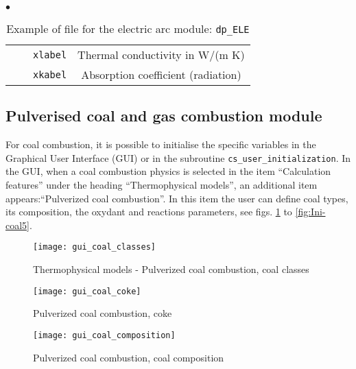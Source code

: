 {{\begin{list}{$\bullet$}{}
\begin{table}[htbp]
\begin{center}
{\begin{tabular}{|c|l|c|c|}
        &                    &    \texttt{xlabel}               & Thermal conductivity in W/(m K)                    \\
        &                    &    \texttt{xkabel\index{xkabel}} & Absorption coefficient (radiation)                 \\   \hline
\end{tabular}
}
\caption{Example of file for the electric arc module:
 \texttt{dp\_ELE}}\label{tab_dpELE}
\end{center}
\end{table}

\end{list}

\clearpage


\subsection{Pulverised
  coal and gas combustion module}
\label{sec:Ini-coal}
For coal combustion, it is possible to initialise the specific variables in the Graphical User Interface (GUI) or in the subroutine \texttt{cs\_user\_initialization}. In the GUI, when a coal combustion physics is selected in the item ``Calculation features'' under the heading ``Thermophysical models'', an additional item appears:``Pulverized coal combustion''. In this item the user can define coal types, its composition, the oxydant and reactions parameters, see figs. \ref{fig:Ini-coal1} to \ref{fig:Ini-coal5}.

\begin{figure}[!ht]
\begin{center}
\texttt{[image: gui\_coal\_classes]}
\caption{Thermophysical models - Pulverized coal combustion, coal classes}
\label{fig:Ini-coal1}
\end{center}
\end{figure}

\begin{figure}[!ht]
\begin{center}
\texttt{[image: gui\_coal\_coke]}
\caption{Pulverized coal combustion, coke}
\label{fig:Ini-coal2}
\end{center}
\end{figure}

\begin{figure}[!ht]
\begin{center}
\texttt{[image: gui\_coal\_composition]}
\caption{Pulverized coal combustion, coal composition}
\label{fig:Ini-coal3}
\end{center}
\end{figure}

}}
